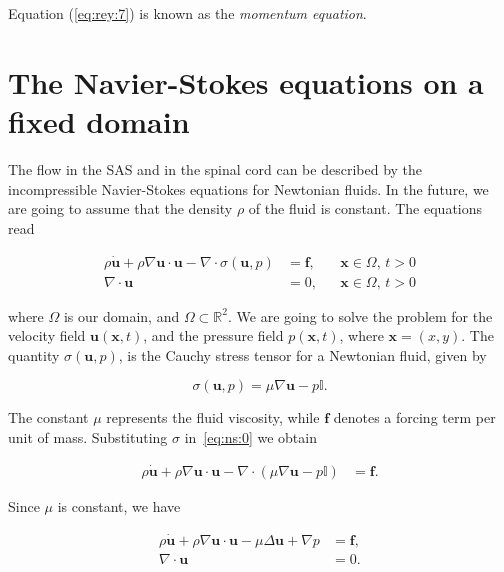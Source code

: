 \documentclass[a4paper,11pt,openright,twoside]{book}
\begin{document}
Equation (\ref{eq:rey:7}) is known as the \emph{momentum equation}.


\section{The Navier-Stokes equations on a fixed domain}


The flow in the SAS and in the spinal cord can be described by the incompressible Navier-Stokes equations for Newtonian fluids. In the future, we are going to assume that the density $\rho$ of the fluid is constant. The equations read

\begin{align}
\label{eq:ns:0}
\rho \dot{\mathbf{u}}
+ \rho \nabla \mathbf{u} \cdot \mathbf{u}
- \nabla \cdot \sigma(\mathbf{u},p)
&= \mathbf{f},  && \mathbf{x} \in \Omega, \, t>0 \\
\nabla \cdot \mathbf{u} &= 0, && \mathbf{x} \in \Omega, \, t>0
\end{align}

where $\Omega$ is our domain, and $\Omega \subset \mathbb{R}^2$.  We are going to solve the problem for the velocity field $\mathbf{u}(\mathbf{x},t)$, and the pressure field $p(\mathbf{x},t)$, where $\mathbf{x} = (x,y)$. The quantity $\sigma(\mathbf{u}, p)$, is the Cauchy stress tensor for a Newtonian fluid, given by

\begin{equation}
\sigma(\mathbf{u}, p) = \mu \nabla \mathbf{u} - p \mathbb{I}.
\end{equation}

The constant $\mu$ represents the fluid viscosity, while $\mathbf{f}$ denotes a forcing term per unit of mass. Substituting $\sigma$ in~\eqref{eq:ns:0} we obtain

\begin{align}
\rho \dot{\mathbf{u}} + \rho \nabla \mathbf{u} \cdot \mathbf{u} - \nabla \cdot (\mu \nabla \mathbf{u} - p \mathbb{I}) &= \mathbf{f}.
\end{align}

Since $\mu$ is constant, we have

\begin{align}
\label{eq:ns:3}
\rho \dot{\mathbf{u}} + \rho \nabla \mathbf{u} \cdot \mathbf{u} - \mu \Delta \mathbf{u} +  \nabla p &= \mathbf{f}, \\
\label{eq:ns:3bis}
\nabla \cdot \mathbf{u} &= 0.
\end{align}
\end{document}
